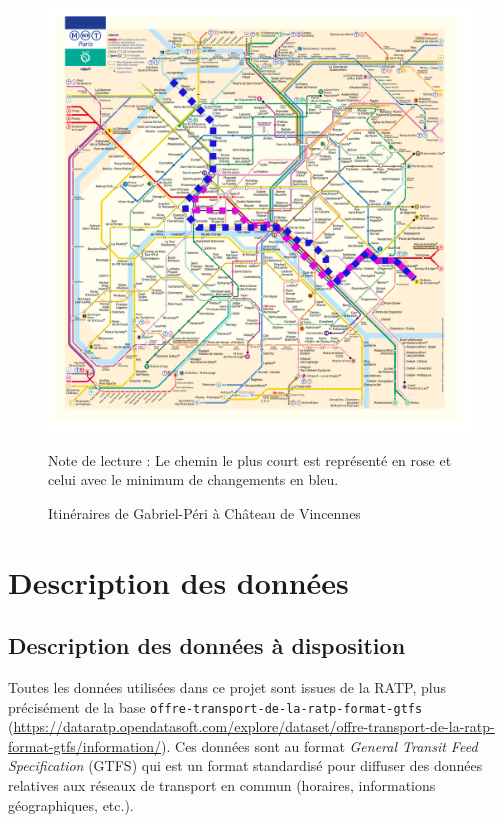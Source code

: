 \documentclass[,french]{article}
\begin{document}
\begin{figure}
\includegraphics[trim = 260px 330px 90px 160px, clip]{img/plan_lignes/Plan-Metro_algo21.pdf}
\captionsetup{margin=0cm,format=hang,justification=justified}
\caption{Itinéraires de Gabriel-Péri à Château de Vincennes}\label{fig:deux_itineraires}

 \footnotesize
Note de lecture : Le chemin le plus court est représenté en \textcolor[HTML]{DB0ADE}{rose} et celui avec le minimum de changements en \textcolor[HTML]{1C14D9}{bleu}. 
\end{figure}

\hypertarget{sec:def_donnees}{%
\section{Description des données}\label{sec:def_donnees}}

\hypertarget{description-des-donnuxe9es-uxe0-disposition}{%
\subsection{Description des données à
disposition}\label{description-des-donnuxe9es-uxe0-disposition}}

Toutes les données utilisées dans ce projet sont issues de la RATP, plus
précisément de la base \texttt{offre-transport-de-la-ratp-format-gtfs}
(\url{https://dataratp.opendatasoft.com/explore/dataset/offre-transport-de-la-ratp-format-gtfs/information/}).
Ces données sont au format \emph{General Transit Feed Specification}
(GTFS) qui est un format standardisé pour diffuser des données relatives
aux réseaux de transport en commun (horaires, informations
géographiques, etc.).
\end{document}
